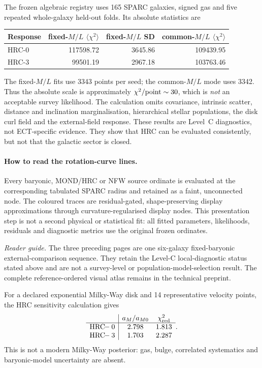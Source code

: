 \documentclass[11pt,a4paper]{article}
\begin{document}
\par\noindent The frozen algebraic registry uses 165 SPARC galaxies, signed
gas and five repeated whole-galaxy held-out folds.  Its absolute statistics
are
\begin{center}
\small
\begin{tabular}{@{}lrrr@{}}
\toprule
Response & fixed-$M/L$ $\langle\chi^2\rangle$ & fixed-$M/L$ SD &
common-$M/L$ $\langle\chi^2\rangle$\\
\midrule
HRC-0 & 117598.72 & 3645.86 & 109439.95\\
HRC-3 & 99501.19 & 2967.18 & 103763.46\\
\bottomrule
\end{tabular}
\end{center}
The fixed-$M/L$ fits use 3343 points per seed; the common-$M/L$ mode
uses 3342.  Thus the absolute scale is approximately
$\chi^2/{\rm point}\sim30$, which is \emph{not} an acceptable survey
likelihood.  The calculation omits covariance, intrinsic scatter, distance
and inclination marginalisation, hierarchical stellar populations, the disk
curl field and the external-field response.  These results are Level~C
diagnostics, not ECT-specific evidence.  They show that HRC can be evaluated
consistently, but not that the galactic sector is closed.

\paragraph{How to read the rotation-curve lines.}
Every baryonic, MOND/HRC or NFW source ordinate is evaluated at
the corresponding tabulated SPARC radius and retained as a faint, unconnected
node.  The coloured traces are residual-gated, shape-preserving display
approximations through curvature-regularised display nodes.  This presentation
step is not a second physical or statistical fit: all fitted parameters,
likelihoods, residuals and diagnostic metrics use the original frozen
ordinates.

\par\noindent\textit{Reader guide.}  The three preceding pages are one
six-galaxy fixed-baryonic external-comparison sequence.  They retain the
Level-C local-diagnostic status stated above and are not a survey-level or
population-model-selection result.  The complete reference-ordered visual
atlas remains in the technical preprint.

For a declared exponential Milky-Way disk and 14 representative velocity
points, the HRC sensitivity calculation gives
\begin{equation}
\begin{array}{c|cc}
 & a_M/a_{M0} & \chi^2_{\rm red}\\ \hline
\mathrm{HRC\!\!-0} & 2.798 & 1.813\\
\mathrm{HRC\!\!-3} & 1.703 & 2.287
\end{array}.
\label{eq:pop_hrc_mw}
\end{equation}
This is not a modern Milky-Way posterior: gas, bulge, correlated systematics
and baryonic-model uncertainty are absent.
\end{document}
